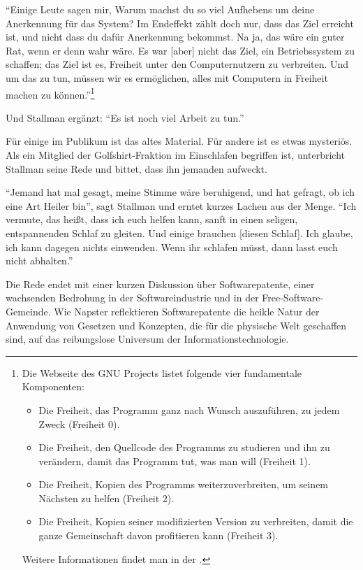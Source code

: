 "`Einige Leute sagen mir, \glq Warum machst du so viel Aufhebens um deine Anerkennung für das System? Im Endeffekt zählt doch nur, dass das Ziel erreicht ist, und nicht dass du dafür Anerkennung bekommst.\grq{} Na ja, das wäre ein guter Rat, wenn er denn wahr wäre. Es war [aber] nicht das Ziel, ein Betriebssystem zu schaffen; das Ziel ist es, Freiheit unter den Computernutzern zu verbreiten. Und um das zu tun, müssen wir es ermöglichen, alles mit Computern in Freiheit machen zu können."'\footnote{Die Webseite des GNU Projects listet folgende vier fundamentale Komponenten:

\begin{itemize}
  \item Die Freiheit, das Programm ganz nach Wunsch auszuführen, zu jedem Zweck (Freiheit 0).
  \item Die Freiheit, den Quellcode des Programms zu studieren und ihn zu verändern, damit das Programm tut, was man will (Freiheit 1).
  \item Die Freiheit, Kopien des Programms weiterzuverbreiten, um seinem Nächsten zu helfen (Freiheit 2).
  \item Die Freiheit, Kopien seiner modifizierten Version zu verbreiten, damit die ganze Gemeinschaft davon profitieren kann (Freiheit 3).
\end{itemize}

Weitere Informationen findet man in der \cite[][]{freeswdef}.}

Und Stallman ergänzt: "`Es ist noch viel Arbeit zu tun."'

Für einige im Publikum ist das altes Material. Für andere ist es etwas mysteriös. Als ein Mitglied der Golfshirt-Fraktion im Einschlafen begriffen ist, unterbricht Stallman seine Rede und bittet, dass ihn jemanden aufweckt.

"`Jemand hat mal gesagt, meine Stimme wäre beruhigend, und hat gefragt, ob ich eine Art Heiler bin"', sagt Stallman und erntet kurzes Lachen aus der Menge. "`Ich vermute, das heißt, dass ich euch helfen kann, sanft in einen seligen, entspannenden Schlaf zu gleiten. Und einige brauchen [diesen Schlaf]. Ich glaube, ich kann dagegen nichts einwenden. Wenn ihr schlafen müsst, dann lasst euch nicht abhalten."'

Die Rede endet mit einer kurzen Diskussion über Softwarepatente, einer wachsenden Bedrohung in der Softwareindustrie und in der Free-Software-Gemeinde. Wie Napster reflektieren Softwarepatente die heikle Natur der Anwendung von Gesetzen und Konzepten, die für die physische Welt geschaffen sind, auf das reibungslose Universum der Informationstechnologie.

